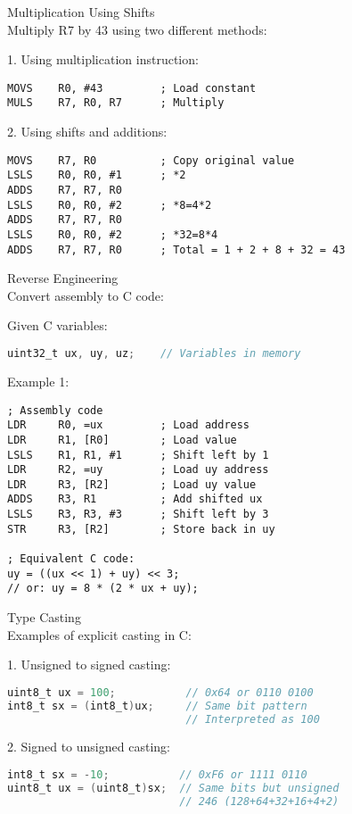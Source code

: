 \begin{example2}{Multiplication Using Shifts}\\
Multiply R7 by 43 using two different methods:

1. Using multiplication instruction:
\begin{lstlisting}[language=armasm, style=basesmol]
MOVS    R0, #43         ; Load constant
MULS    R7, R0, R7      ; Multiply
\end{lstlisting}

2. Using shifts and additions:
\begin{lstlisting}[language=armasm, style=basesmol]
MOVS    R7, R0          ; Copy original value
LSLS    R0, R0, #1      ; *2
ADDS    R7, R7, R0
LSLS    R0, R0, #2      ; *8=4*2
ADDS    R7, R7, R0
LSLS    R0, R0, #2      ; *32=8*4
ADDS    R7, R7, R0      ; Total = 1 + 2 + 8 + 32 = 43
\end{lstlisting}
\end{example2}

\begin{example2}{Reverse Engineering}\\
Convert assembly to C code:

Given C variables:
\begin{lstlisting}[language=C, style=basesmol]
uint32_t ux, uy, uz;    // Variables in memory
\end{lstlisting}

Example 1:
\begin{lstlisting}[language=armasm, style=basesmol]
; Assembly code
LDR     R0, =ux         ; Load address
LDR     R1, [R0]        ; Load value
LSLS    R1, R1, #1      ; Shift left by 1
LDR     R2, =uy         ; Load uy address
LDR     R3, [R2]        ; Load uy value
ADDS    R3, R1          ; Add shifted ux
LSLS    R3, R3, #3      ; Shift left by 3
STR     R3, [R2]        ; Store back in uy

; Equivalent C code:
uy = ((ux << 1) + uy) << 3;
// or: uy = 8 * (2 * ux + uy);
\end{lstlisting}
\end{example2}

\begin{example2}{Type Casting}\\
Examples of explicit casting in C:

1. Unsigned to signed casting:
\begin{lstlisting}[language=C, style=basesmol]
uint8_t ux = 100;           // 0x64 or 0110 0100
int8_t sx = (int8_t)ux;     // Same bit pattern
                            // Interpreted as 100
\end{lstlisting}

2. Signed to unsigned casting:
\begin{lstlisting}[language=C, style=basesmol]
int8_t sx = -10;           // 0xF6 or 1111 0110
uint8_t ux = (uint8_t)sx;  // Same bits but unsigned
                           // 246 (128+64+32+16+4+2)
\end{lstlisting}
\end{example2}

